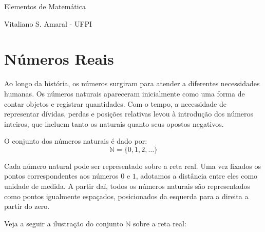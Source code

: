 \documentclass[12pt]{book}
\begin{document}
{\Large
	
	
\vspace{4.5cm}
{\sc \Huge
	\centerline{Elementos de Matemática}

	\vspace{7.5cm}}
	
		
}

{\Large \begin{flushright}
	\begin{minipage}[t]{7.0cm}
		Vitaliano S. Amaral - UFPI
	\end{minipage}
\end{flushright}
}

\date{\today}


\tableofcontents

%
%
\chapter{Números Reais}

Ao longo da história, os números surgiram para atender a diferentes necessidades humanas. Os números naturais apareceram inicialmente como uma forma de contar objetos e registrar quantidades. Com o tempo, a necessidade de representar dívidas, perdas e posições relativas levou à introdução dos números inteiros, que incluem tanto os naturais quanto seus opostos negativos.


O conjunto dos números naturais é dado por:
$$
\mathbb{N} = \{0, 1, 2, \dots\}
$$

Cada número natural pode ser representado sobre a reta real. Uma vez fixados os pontos correspondentes aos números $0$ e $1$, adotamos a distância entre eles como unidade de medida. A partir daí, todos os números naturais são representados como pontos igualmente espaçados, posicionados da esquerda para a direita a partir do zero.

Veja a seguir a ilustração do conjunto $\mathbb{N}$ sobre a reta real:
\end{document}
